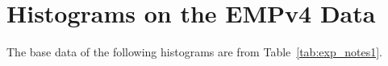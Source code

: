 \documentclass[10pt]{article}
\begin{document}
\newpage

\section{Histograms on the EMPv4 Data~\label{sec:empv4_hist}}
The base data of the following histograms are from Table~\ref{tab:exp_notes1}.

\begin{figure}[hp!]
	\centering
\end{figure}
\end{document}
